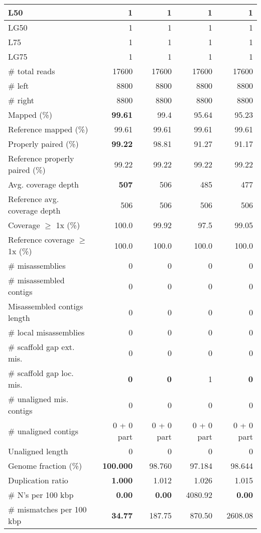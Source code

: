 \documentclass[12pt,a4paper]{article}
\begin{document}
\begin{table}[ht]
\begin{center}
\begin{tabular}{|l*{4}{|r}|}
L50 & 1 & 1 & 1 & 1 \\ \hline
LG50 & 1 & 1 & 1 & 1 \\ \hline
L75 & 1 & 1 & 1 & 1 \\ \hline
LG75 & 1 & 1 & 1 & 1 \\ \hline
\# total reads & 17600 & 17600 & 17600 & 17600 \\ \hline
\# left & 8800 & 8800 & 8800 & 8800 \\ \hline
\# right & 8800 & 8800 & 8800 & 8800 \\ \hline
Mapped (\%) & {\bf 99.61} & 99.4 & 95.64 & 95.23 \\ \hline
Reference mapped (\%) & 99.61 & 99.61 & 99.61 & 99.61 \\ \hline
Properly paired (\%) & {\bf 99.22} & 98.81 & 91.27 & 91.17 \\ \hline
Reference properly paired (\%) & 99.22 & 99.22 & 99.22 & 99.22 \\ \hline
Avg. coverage depth & {\bf 507} & 506 & 485 & 477 \\ \hline
Reference avg. coverage depth & 506 & 506 & 506 & 506 \\ \hline
Coverage $\geq$ 1x (\%) & 100.0 & 99.92 & 97.5 & 99.05 \\ \hline
Reference coverage $\geq$ 1x (\%) & 100.0 & 100.0 & 100.0 & 100.0 \\ \hline
\# misassemblies & 0 & 0 & 0 & 0 \\ \hline
\# misassembled contigs & 0 & 0 & 0 & 0 \\ \hline
Misassembled contigs length & 0 & 0 & 0 & 0 \\ \hline
\# local misassemblies & 0 & 0 & 0 & 0 \\ \hline
\# scaffold gap ext. mis. & 0 & 0 & 0 & 0 \\ \hline
\# scaffold gap loc. mis. & {\bf 0} & {\bf 0} & 1 & {\bf 0} \\ \hline
\# unaligned mis. contigs & 0 & 0 & 0 & 0 \\ \hline
\# unaligned contigs & 0 + 0 part & 0 + 0 part & 0 + 0 part & 0 + 0 part \\ \hline
Unaligned length & 0 & 0 & 0 & 0 \\ \hline
Genome fraction (\%) & {\bf 100.000} & 98.760 & 97.184 & 98.644 \\ \hline
Duplication ratio & {\bf 1.000} & 1.012 & 1.026 & 1.015 \\ \hline
\# N's per 100 kbp & {\bf 0.00} & {\bf 0.00} & 4080.92 & {\bf 0.00} \\ \hline
\# mismatches per 100 kbp & {\bf 34.77} & 187.75 & 870.50 & 2608.08 \\ \hline

\end{tabular}
\end{center}
\end{table}
\end{document}
